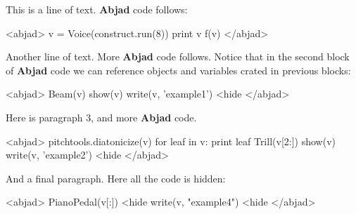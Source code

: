 \documentclass[11pt]{article}
\begin{document}
This is a line of text. \textbf{Abjad} code follows:

<abjad>
v = Voice(construct.run(8))
print v
f(v)
</abjad>

Another line of text. More \textbf{Abjad} code follows. Notice that in the second block of \textbf{Abjad} code we can reference objects and variables crated in previous blocks:

<abjad>
Beam(v)
show(v)
write(v, 'example1') <hide
</abjad>

Here is paragraph 3, and more \textbf{Abjad} code.

<abjad>
pitchtools.diatonicize(v)
for leaf in v: print leaf
Trill(v[2:])
show(v)
write(v, 'example2') <hide
</abjad>

And a final paragraph. Here all the code is hidden:

<abjad>
PianoPedal(v[:]) <hide
write(v, "example4") <hide
</abjad>
\end{document}

